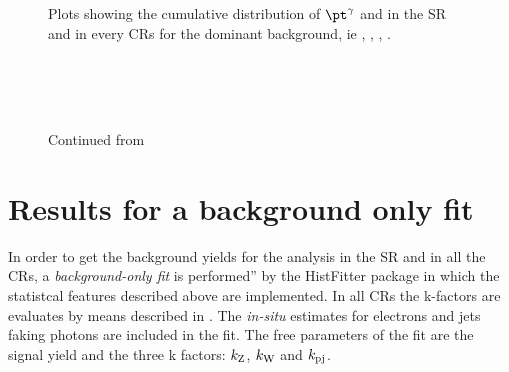 \begin{figure}[pt]
\centering
{} \quad
{} \\

 \quad
{} \\

\caption{Plots showing the cumulative distribution of $\pt^{\gamma}$ and \met in the SR and in every CRs for the dominant background, ie \znng, \zg, \wg, \gj.}
\label{fig:prefit}
\end{figure}

\begin{figure}[pt]
\centering

 \quad
{} \\

 \quad
{} \\

 \quad
{} \\

\caption{Continued from \Fig{\ref{fig:prefit}}}
\label{fig:prefitcont}
\end{figure}

\section{Results for a background only fit}
In order to get the background yields for the analysis in the SR and in all the CRs, a \emph{background-only fit} is performed'' by the HistFitter package in which the statistcal features described above are implemented. In all CRs the k-factors are evaluates by means described in \Sect{\ref{sec:kfactor}}. The \emph{in-situ} estimates for electrons and jets faking photons are included in the fit. The free parameters of the fit are the signal yield and the three k factors: $k_{\textup{Z}}$, $k_{\textup{W}}$ and $k_{\textup{pj}}$.

